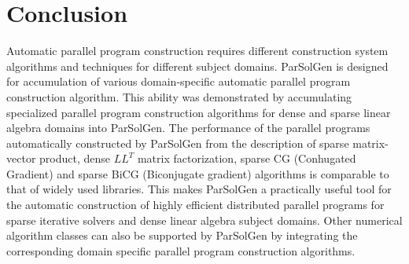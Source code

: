 \documentclass[conference]{IEEEtran}
\begin{document}
\section{Conclusion}
Automatic parallel program construction requires different construction system algorithms 
and techniques for different subject domains. ParSolGen is designed for accumulation of 
various domain-specific automatic parallel program construction algorithm. This ability 
was demonstrated by accumulating specialized parallel program construction algorithms for 
dense and sparse linear algebra domains into ParSolGen. The performance of the parallel 
programs automatically constructed by ParSolGen from the description of 
sparse matrix-vector product, dense \(LL^T\) matrix factorization, sparse CG (Conhugated Gradient) and 
sparse BiCG (Biconjugate gradient) algorithms is comparable to that of widely used libraries. 
This makes ParSolGen a practically useful tool for the automatic construction of highly efficient 
distributed parallel programs for sparse iterative solvers and dense linear algebra subject domains. 
Other numerical algorithm classes can also be supported by ParSolGen by integrating the corresponding 
domain specific parallel program construction algorithms.
\end{document}
